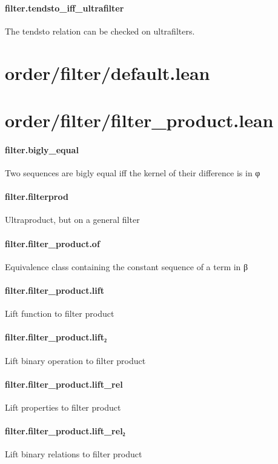 \documentclass{article}
\begin{document}
\paragraph{filter.tendsto\_iff\_ultrafilter}
\par
The 
\colorbox[RGB]{253,246,227}{{{{\color[RGB]{101, 123, 131} tendsto }}}} relation can be checked on ultrafilters.
\section{order/filter/default.lean}\section{order/filter/filter\_product.lean}\paragraph{filter.bigly\_equal}
\par
Two sequences are bigly equal iff the kernel of their difference is in φ
\paragraph{filter.filterprod}
\par
Ultraproduct, but on a general filter
\paragraph{filter.filter\_product.of}
\par
Equivalence class containing the constant sequence of a term in β
\paragraph{filter.filter\_product.lift}
\par
Lift function to filter product
\paragraph{filter.filter\_product.lift₂}
\par
Lift binary operation to filter product
\paragraph{filter.filter\_product.lift\_rel}
\par
Lift properties to filter product
\paragraph{filter.filter\_product.lift\_rel₂}
\par
Lift binary relations to filter product
\end{document}
